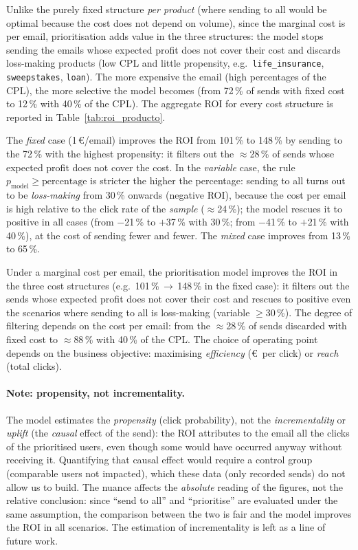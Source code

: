 Unlike the purely fixed structure \emph{per product} (where sending to all would be optimal because
the cost does not depend on volume), since the marginal cost is per email, prioritisation adds value in
the three structures: the model stops sending the emails whose expected profit does not cover their cost and discards
loss-making products (low CPL and little propensity, e.g.\ \texttt{life\_insurance}, \texttt{sweepstakes},
\texttt{loan}). The more expensive the email (high percentages of the CPL), the more selective the model becomes
(from 72\,\% of sends with fixed cost to 12\,\% with 40\,\% of the CPL). The aggregate ROI for every cost structure is reported in Table~\ref{tab:roi_producto}.


The \emph{fixed} case (1\,\euro/email) improves the ROI from 101\,\% to 148\,\% by sending to the 72\,\% with the highest
propensity: it filters out the $\approx$28\,\% of sends whose expected profit does not cover the cost. In the
\emph{variable} case, the rule $p_\text{model}\ge\text{percentage}$ is stricter the higher the
percentage: sending to all turns out to be \emph{loss-making} from 30\,\% onwards (negative ROI), because the cost per
email is high relative to the click rate of the \emph{sample} ($\approx$24\,\%); the model rescues it to
positive in all cases (from $-$21\,\% to $+$37\,\% with 30\,\%; from $-$41\,\% to $+$21\,\% with
40\,\%), at the cost of sending fewer and fewer. The \emph{mixed} case improves from 13\,\% to 65\,\%.

\begin{hallazgo}
Under a marginal cost per email, the prioritisation model improves the ROI in the three
cost structures (e.g.\ 101\,\%\,$\to$\,148\,\% in the fixed case): it filters out the sends whose expected profit
does not cover their cost and rescues to positive even the scenarios where sending to all is
loss-making (variable $\geq$30\,\%). The degree of filtering depends on the cost per email: from the $\approx$28\,\% of
sends discarded with fixed cost to $\approx$88\,\% with 40\,\% of the CPL. The choice of operating point
depends on the business objective: maximising \emph{efficiency} (\euro\ per click) or \emph{reach} (total
clicks).
\end{hallazgo}

\paragraph{Note: propensity, not incrementality.} The model estimates the \emph{propensity} (click probability), not the \emph{incrementality} or \textit{uplift} (the \emph{causal} effect of the send): the ROI attributes to the email all the clicks of the prioritised users, even though some would have occurred anyway without receiving it. Quantifying that causal effect would require a control group (comparable users not impacted), which these data (only recorded sends) do not allow us to build. The nuance affects the \emph{absolute} reading of the figures, not the relative conclusion: since ``send to all'' and ``prioritise'' are evaluated under the same assumption, the comparison between the two is fair and the model improves the ROI in all scenarios. The estimation of incrementality is left as a line of future work.

